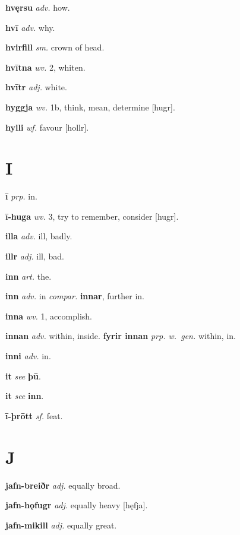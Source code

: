 \documentclass[12pt,letterpaper]{book}
\newcommand\emptypage{\clearpage{\pagestyle{empty}\cleardoublepage}}
\begin{document}
\noindent
\textbf{hvęrsu} \textit{adv.} how.

\noindent
\textbf{hvī} \textit{adv.} why.

\noindent
\textbf{hvirfill} \textit{sm.} crown of head.

\noindent
\textbf{hvītna} \textit{wv.} 2, whiten.

\noindent
\textbf{hvītr} \textit{adj.} white.

\noindent
\textbf{hyggja} \textit{wv.} 1b, think, mean, determine [hugr].

\noindent
\textbf{hylli} \textit{wf.} favour [hollr].

\emptypage

\chapter*{I}

\noindent
\textbf{ī} \textit{prp.} in.

\noindent
\textbf{ī-huga} \textit{wv.} 3, try to remember, consider [hugr].

\noindent
\textbf{illa} \textit{adv.} ill, badly.

\noindent
\textbf{illr} \textit{adj.} ill, bad.

\noindent
\textbf{inn} \textit{art.} the.

\noindent
\textbf{inn} \textit{adv.} in \textit{compar.} \textbf{innar}, further in.

\noindent
\textbf{inna} \textit{wv.} 1, accomplish.

\noindent
\textbf{innan} \textit{adv.} within, inside.  \textbf{fyrir innan} \textit{prp.
	w.\ gen.} within, in.

\noindent
\textbf{inni} \textit{adv.} in.

\noindent
\textbf{it} \textit{} \textit{see} \textbf{þū}.

\noindent
\textbf{it} \textit{} \textit{see} \textbf{inn}.

\noindent
\textbf{ī-þrōtt} \textit{sf.} feat.

\emptypage

\chapter*{J}

\noindent
\textbf{jafn-breiðr} \textit{adj.} equally broad.

\noindent
\textbf{jafn-hǫfugr} \textit{adj.} equally heavy [hęfja].

\noindent
\textbf{jafn-mikill} \textit{adj.} equally great.
\end{document}
